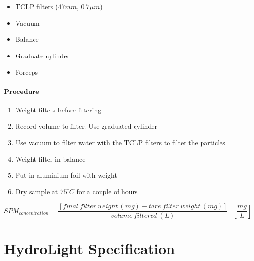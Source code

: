 \begin{appendices}
\begin{itemize}
  \item TCLP filters ($47 mm$, $0.7\mu m$)
  \item Vacuum
  \item Balance
  \item Graduate cylinder
  \item Forceps

\end{itemize}

\subsubsection{Procedure}
\begin{enumerate}
  \item Weight filters before filtering
  \item Record volume to filter. Use graduated cylinder
  \item Use vacuum to filter water with the TCLP filters to filter the particles
  \item Weight filter in balance
  \item Put in aluminium foil with weight
  \item Dry sample at $75^\circ C$ for a couple of hours
\end{enumerate}


\begin{equation}
SPM_{\displaystyle concentration} = \frac{[final~filter~weight~(mg) - tare~filter~weight~(mg)]}{volume~filtered~(L)}~~~\left[\frac{mg}{L}\right]
\end{equation}



\chapter{HydroLight Specification}



\end{appendices}
